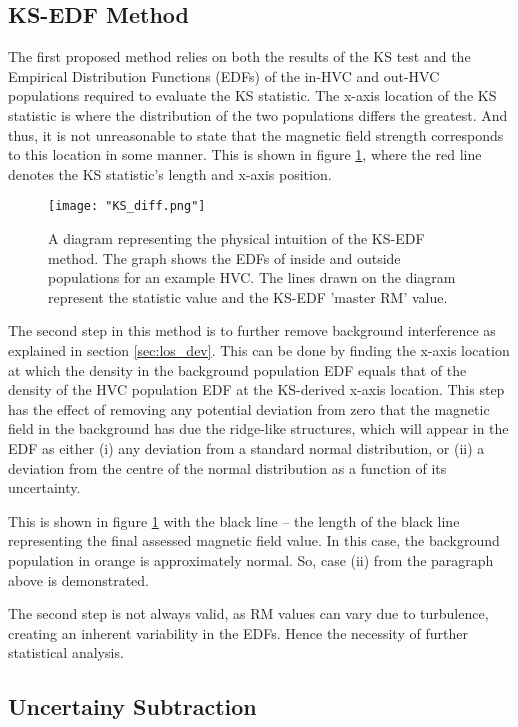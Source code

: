 \subsection{KS-EDF Method}
\label{ssec:KS_EDF}

The first proposed method relies on both the results of the KS test and the Empirical Distribution Functions (EDFs) of the in-HVC and out-HVC populations required to evaluate the KS statistic. The x-axis location of the KS statistic is where the distribution of the two populations differs the greatest. And thus, it is not unreasonable to state that the magnetic field strength corresponds to this location in some manner. This is shown in figure \ref{fig:KSdiff}, where the red line denotes the KS statistic's length and x-axis position.


\begin{figure}
    \texttt{[image: "KS\_diff.png"]}
    \centering
    \caption{A diagram representing the physical intuition of the KS-EDF method. The graph shows the EDFs of inside and outside populations for an example HVC. The lines drawn on the diagram represent the statistic value and the KS-EDF 'master RM' value.}
    \label{fig:KSdiff}
\end{figure}

The second step in this method is to further remove background interference as explained in section \ref{sec:los_dev}. This can be done by finding the x-axis location at which the density in the background population EDF equals that of the density of the HVC population EDF at the KS-derived x-axis location. This step has the effect of removing any potential deviation from zero that the magnetic field in the background has due the ridge-like structures, which will appear in the EDF as either (i) any deviation from a standard normal distribution, or (ii) a deviation from the centre of the normal distribution as a function of its uncertainty.


This is shown in figure \ref{fig:KSdiff} with the black line – the length of the black line representing the final assessed magnetic field value. In this case, the background population in orange is approximately normal. So, case (ii) from the paragraph above is demonstrated.


The second step is not always valid, as RM values can vary due to turbulence, creating an inherent variability in the EDFs. Hence the necessity of further statistical analysis.


\subsection{Uncertainy Subtraction}
\label{ssec:sigma_sub}

